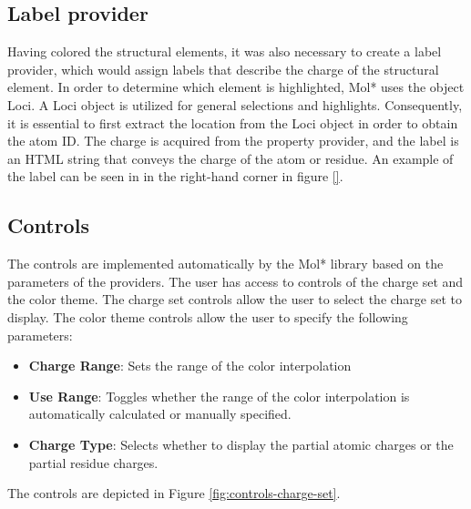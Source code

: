 \documentclass[
  digital,     %
  oneside,     %
  nosansbold,  %
  nocolorbold, %
  lof,         %
  lot,         %
]{fithesis4}
\begin{document}
\subsection{Label provider}
\label{subsection:label_provider}


Having colored the structural elements, it was also necessary to create a label provider, which would assign labels that describe the charge of the structural element. In order to determine which element is highlighted, Mol* uses the object Loci. A Loci object is utilized for general selections and highlights. Consequently, it is essential to first extract the location from the Loci object in order to obtain the atom ID. The charge is acquired from the property provider, and the label is an HTML string that conveys the charge of the atom or residue. An example of the label can be seen in in the right-hand corner in figure \ref{}.

\subsection{Controls}
\label{subsection:controls}

The controls are implemented automatically by the Mol* library based on the parameters of the providers. The user has access to controls of the charge set and the color theme. The charge set controls allow the user to select the charge set to display. The color theme controls allow the user to specify the following parameters:

\begin{itemize}
  \item \textbf{Charge Range}: Sets the range of the color interpolation
  \item \textbf{Use Range}: Toggles whether the range of the color interpolation is automatically calculated or manually specified.
  \item \textbf{Charge Type}: Selects whether to display the partial atomic charges or the partial residue charges.
\end{itemize}

The controls are depicted in Figure \ref{fig:controls-charge-set}.
\end{document}
